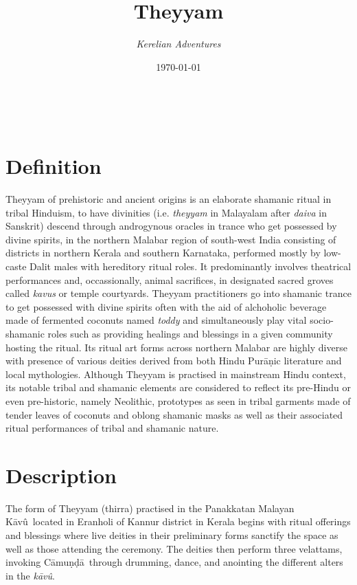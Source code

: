 \documentclass[a4paper, 11pt]{article} %
\title{\textbf{Theyyam}} %
\author{\textit{Kerelian Adventures}} %
\date{\today} %
\makeatletter
\newcommand{\camunda}[0]{C\={a}mu\d{n}\d{d}\={a}}
\newcommand{\kavu}[0]{\textit{k\={a}v\^{u}}}
\newcommand{\Kavu}[0]{K\={a}v\^{u}}
\renewcommand{\maketitle}{ %
\begin{flushright} %
{\LARGE\@title} %

\vspace{10pt} %

{\@author} %
\\\@date %

\vspace{30pt} %
\end{flushright}
}
\makeatother
\begin{document}
\maketitle %

\thispagestyle{empty}


\section{Definition}
  \label{sec:Definition}

Theyyam of prehistoric and ancient origins is an elaborate shamanic ritual in tribal Hinduism, to have divinities (i.e. \textit{theyyam} in Malayalam after \textit{daiva} in Sanskrit) descend through androgynous oracles in trance who get possessed by divine spirits, in the northern Malabar region of south-west India consisting of districts in northern Kerala and southern Karnataka, performed mostly by low-caste Dalit males with hereditory ritual roles. It predominantly involves theatrical performances and, occassionally, animal sacrifices, in designated sacred groves called \textit{kavus} or temple courtyards. Theyyam practitioners go into shamanic trance to get possessed with divine spirits often with the aid of alchoholic beverage made of fermented coconuts named \textit{toddy} and simultaneously play vital socio-shamanic roles such as providing healings and blessings in a given community hosting the ritual. Its ritual art forms across northern Malabar are highly diverse with presence of various deities derived from both Hindu Purāṇic literature and local mythologies. Although Theyyam is practised in mainstream Hindu context, its notable tribal and shamanic elements are considered to reflect its pre-Hindu or even pre-historic, namely Neolithic, prototypes as seen in tribal garments made of tender leaves of coconuts and oblong shamanic masks as well as their associated ritual performances of tribal and shamanic nature.  

\section{Description}%
  \label{sec:Description}
  
The form of Theyyam (thirra) practised in the Panakkatan Malayan \Kavu\ located in Eranholi of Kannur district in Kerala begins with ritual offerings and blessings where live deities in their preliminary forms sanctify the space as well as those attending the ceremony.
The deities then perform three velattams, invoking \camunda\ through drumming, dance, and anointing the different alters in the \kavu.
\end{document}
